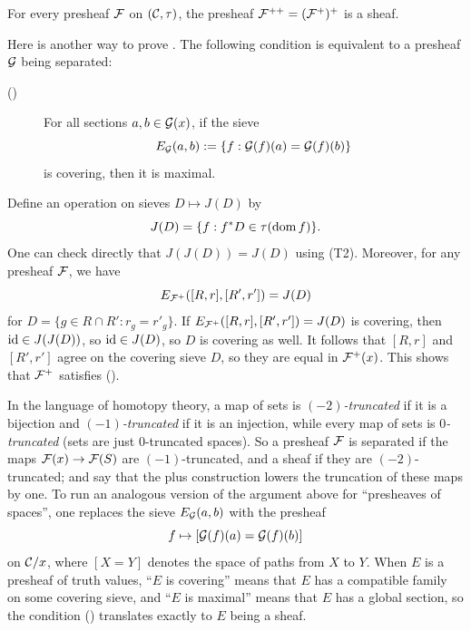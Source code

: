 \begin{corollary}\label{cor:chap:sheaves:sec:sites:double plus construction is a sheaf}
    For every presheaf $\cal{F}$ on $(\catC,\tau)$, the presheaf $\cal{F}^{++} = (\cal{F}^+)^+$ is a sheaf.
\end{corollary}

\begin{remark*}
    Here is another way to prove . The following condition is equivalent to a presheaf $\cal{G}$ being separated:
    \begin{description}
        \item[(\faLink)] For all sections $a,b \in \cal{G}(x)$, if the sieve
              \[E_{\cal{G}}(a,b) := \{f : \cal{G}(f)(a) = \cal{G}(f)(b)\}\]
              is covering, then it is maximal.
    \end{description}
    Define an operation on sieves $D \mapsto J(D)$ by
    \[J(D) = \{f : f^* D \in \tau(\dom f)\}.\]
    One can check directly that $J(J(D)) = J(D)$ using (T2). Moreover, for any presheaf $\cal{F}$, we have
    \[E_{\cal{F}^+}([R,r],[R',r']) = J(D)\]
    for $D = \{g \in R \cap R' : r_g = r'_g\}$. If $E_{\cal{F}^+}([R,r],[R',r']) = J(D)$ is covering, then $\id \in J(J(D))$, so $\id \in J(D)$, so $D$ is covering as well. It follows that $[R,r]$ and $[R',r']$ agree on the covering sieve $D$, so they are equal in $\cal{F}^+(x)$. This shows that $\cal{F}^+$ satisfies (\faLink).

    In the language of homotopy theory, a map of sets is \emph{$(-2)$-truncated} if it is a bijection and \emph{$(-1)$-truncated} if it is an injection, while every map of sets is \emph{$0$-truncated} (sets are just $0$-truncated spaces). So a presheaf $\cal{F}$ is separated if the maps $\cal{F}(x) \to \cal{F}(S)$ are $(-1)$-truncated, and a sheaf if they are $(-2)$-truncated;  and  say that the plus construction lowers the truncation of these maps by one. To run an analogous version of the argument above for ``presheaves of spaces'', one replaces the sieve $E_{\cal{G}}(a,b)$ with the presheaf
    \[f \mapsto [\cal{G}(f)(a) = \cal{G}(f)(b)]\]
    on $\catC/x$, where $[X = Y]$ denotes the space of paths from $X$ to $Y$. When $E$ is a presheaf of truth values, ``$E$ is covering'' means that $E$ has a compatible family on some covering sieve, and ``$E$ is maximal'' means that $E$ has a global section, so the condition (\faLink) translates exactly to $E$ being a sheaf.
\end{remark*}

